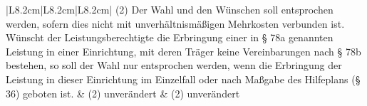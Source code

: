\documentclass[10pt,a4paper,landscape]{article}
\begin{document}
\begin{longtable}{|L{8.2cm}|L{8.2cm}|L{8.2cm}|}
\hhline{|---|}
(2) Der Wahl und den Wünschen soll  \newline entsprochen werden, sofern dies nicht mit  \newline unverhältnismäßigen Mehrkosten  \newline verbunden ist. Wünscht der  \newline Leistungsberechtigte die Erbringung einer  \newline in \S{} 78a genannten Leistung in einer  \newline Einrichtung, mit deren Träger keine  \newline Vereinbarungen nach \S{} 78b bestehen, so  \newline soll der Wahl nur entsprochen werden,  \newline wenn die Erbringung der Leistung in dieser  \newline Einrichtung im Einzelfall oder nach  \newline Maßgabe des Hilfeplans (\S{} 36) geboten ist. & (2) unverändert & (2) unverändert \\
\hhline{|---|}

\end{longtable}
\end{document}
